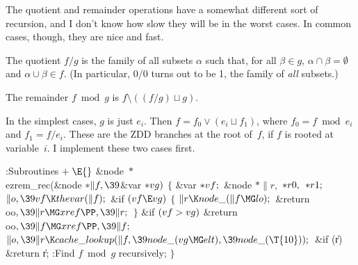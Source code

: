 The quotient and remainder operations have a somewhat different
sort of recursion, and I don't know how slow they will be in
the worst cases. In common cases, though, they are nice and fast.

The quotient $f/g$ is the family of all subsets $\alpha$ such that,
for all $\beta\in g$, $\alpha\cap\beta=\emptyset$ and $\alpha\cup\beta\in f$.
(In particular, 0/0 turns out to be 1, the family of {\it all\/} subsets.)

The remainder $f\bmod g$ is $f\setminus((f/g)\sqcup g)$.

In the simplest cases, $g$ is just $e_i$. Then $f=f_0\lor(e_i\sqcup f_1)$,
where $f_0=f\bmod e_i$ and $f_1=f/e_i$. These are the ZDD branches
at the root of~$f$, if $f$ is rooted at variable~$i$.
I implement these two cases first.

\Y\B\4:Subroutines\X${}\mathrel+\E{}$\6
\&{node} ${}{*}{}$\\{ezrem\_rec}(\&{node} ${}{*}\|f,\39{}$\&{var} ${}{*}%
\\{vg}){}$\1\1\2\2\6
${}\{{}$\1\6
\&{var} ${}{*}\\{vf};{}$\6
\&{node} ${}{*}\|r,{}$ ${}{*}\\{r0},{}$ ${}{*}\\{r1};{}$\7
${}\|o,\39\\{vf}\K\\{thevar}(\|f);{}$\6
\&{if} ${}(\\{vf}\E\\{vg}){}$\5
${}\{{}$\1\6
${}\|r\K\\{node\_}(\|f\MG\\{lo});{}$\6
\&{return} \\{oo}${},\39\|r\MG\\{xref}\PP,\39\|r;{}$\6
\4${}\}{}$\2\6
\&{if} ${}(\\{vf}>\\{vg}){}$\1\5
\&{return} \\{oo}${},\39\|f\MG\\{xref}\PP,\39\|f;{}$\2\6
${}\|o,\39\|r\K\\{cache\_lookup}(\|f,\39\\{node\_}(\\{vg}\MG\\{elt}),\39\\{node%
\_}(\T{10}));{}$\6
\&{if} (\|r)\1\5
\&{return} \|r;\2\6
:Find $f\bmod g$ recursively\X;\6
\4${}\}{}$\2\par
\fi

